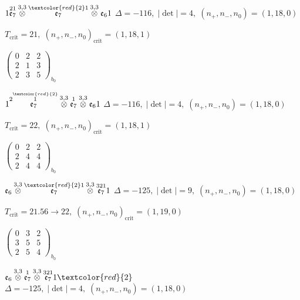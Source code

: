 \documentclass[10pt]{article}
\begin{document}
$1\overset{21}{\mathfrak{e}_7}\overset{3,3}{\otimes}\overset{\textcolor{red}{2}1}{\mathfrak{e}_7}\overset{3,3}{\otimes}\mathfrak{e}_61$ \quad $\Delta=-116,\; |\det|=4,\; (n_+,n_-,n_0)=(1,18,0)$

\hspace{1em}$T_{\text{crit}}=21,\; (n_+,n_-,n_0)_{\text{crit}}=(1,18,1)$

\hspace{2em}$\left(\begin{smallmatrix}0 & 2 & 2 \\ 2 & 1 & 3 \\ 2 & 3 & 5\end{smallmatrix}\right)_{\!b_0}$

$1\overset{2\overset{\textcolor{red}{2}}{1}}{\mathfrak{e}_7}\overset{3,3}{\otimes}\overset{1}{\mathfrak{e}_7}\overset{3,3}{\otimes}\mathfrak{e}_61$ \quad $\Delta=-116,\; |\det|=4,\; (n_+,n_-,n_0)=(1,18,0)$

\hspace{1em}$T_{\text{crit}}=22,\; (n_+,n_-,n_0)_{\text{crit}}=(1,18,1)$

\hspace{2em}$\left(\begin{smallmatrix}0 & 2 & 2 \\ 2 & 4 & 4 \\ 2 & 4 & 4\end{smallmatrix}\right)_{\!b_0}$

\smallskip

$\mathfrak{e}_6\overset{3,3}{\otimes}\overset{\textcolor{red}{2}1}{\mathfrak{e}_7}\overset{3,3}{\otimes}\overset{321}{\mathfrak{e}_7}1$ \quad $\Delta=-125,\; |\det|=9,\; (n_+,n_-,n_0)=(1,18,0)$

\hspace{1em}$T_{\text{crit}}=21.56 \to 22,\; (n_+,n_-,n_0)_{\text{crit}}=(1,19,0)$

\hspace{2em}$\left(\begin{smallmatrix}0 & 3 & 2 \\ 3 & 5 & 5 \\ 2 & 5 & 4\end{smallmatrix}\right)_{\!b_0}$

$\mathfrak{e}_6\overset{3,3}{\otimes}\overset{1}{\mathfrak{e}_7}\overset{3,3}{\otimes}\overset{321}{\mathfrak{e}_7}1\textcolor{red}{2}$ \quad $\Delta=-125,\; |\det|=4,\; (n_+,n_-,n_0)=(1,18,0)$
\end{document}
